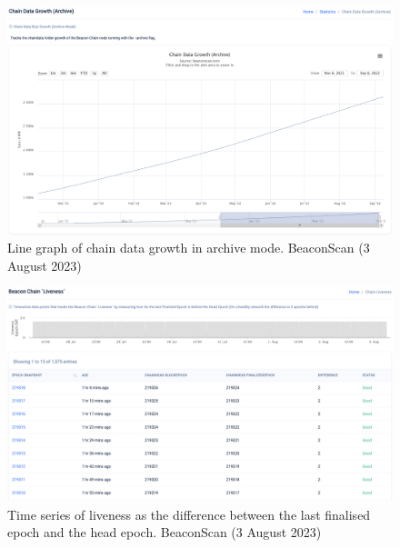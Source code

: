 \documentclass[UTF8]{article}
\begin{document}
\begin{figure}[htbp]
\begin{center}
\includegraphics[width=\linewidth]{images/beaconscan18}
\caption{Line graph of chain data growth in archive mode. BeaconScan (3 August 2023)}
\label{fig:beaconscan18}
\end{center}
\end{figure}

\begin{figure}[htbp]
\begin{center}
\includegraphics[width=\linewidth]{images/beaconscan19}
\caption{Time series of liveness as the difference between the last finalised epoch and the head epoch. BeaconScan (3 August 2023)}
\label{fig:beaconscan19}
\end{center}
\end{figure}

\clearpage

\end{document}
